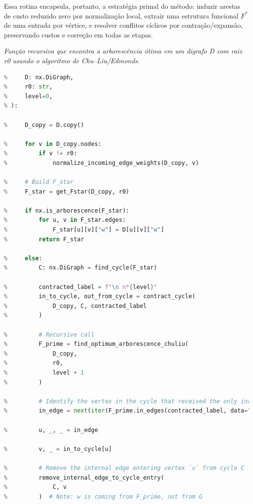 Essa rotina encapsula, portanto, a estratégia primal do método: induzir arestas de custo reduzido zero por normalização local, extrair uma estrutura funcional \(F^*\) de uma entrada por vértice, e resolver conflitos cíclicos por contração/expansão, preservando custos e correção em todas as etapas.

\begin{tcolorbox}[
        enhanced, breakable,
        colframe=blue!60!black, colback=blue!2,
        colbacktitle=blue!15, coltitle=black,
        title={Procedimento principal (recursivo)},
        boxed title style={sharp corners, boxrule=0.6pt},
        sharp corners, boxrule=0.6pt
    ]
    \emph{Função recursiva que encontra a arborescência ótima em um digrafo D com raiz r0 usando o algoritmo de Chu–Liu/Edmonds.}
    \tcblower
    \begin{lstlisting}[mathescape=true, language=Python]
% def find_optimum_arborescence_chuliu(
%     D: nx.DiGraph,
%     r0: str,
%     level=0,
% ):

%     D_copy = D.copy()

%     for v in D_copy.nodes:
%         if v != r0:
%             normalize_incoming_edge_weights(D_copy, v)

%     # Build F_star
%     F_star = get_Fstar(D_copy, r0)

%     if nx.is_arborescence(F_star):
%         for u, v in F_star.edges:
%             F_star[u][v]["w"] = D[u][v]["w"]
%         return F_star

%     else:
%         C: nx.DiGraph = find_cycle(F_star)
            
%         contracted_label = f"\n n*{level}"
%         in_to_cycle, out_from_cycle = contract_cycle(
%             D_copy, C, contracted_label
%         )

%         # Recursive call
%         F_prime = find_optimum_arborescence_chuliu(
%             D_copy,
%             r0,
%             level + 1
%         )

%         # Identify the vertex in the cycle that received the only incoming edge from the arborescence
%         in_edge = next(iter(F_prime.in_edges(contracted_label, data="w")), None)

%         u, _, _ = in_edge

%         v, _ = in_to_cycle[u]

%         # Remove the internal edge entering vertex `v` from cycle C
%         remove_internal_edge_to_cycle_entry(
%             C, v
%         )  # Note: w is coming from F_prime, not from G


\end{lstlisting}
\end{tcolorbox}
